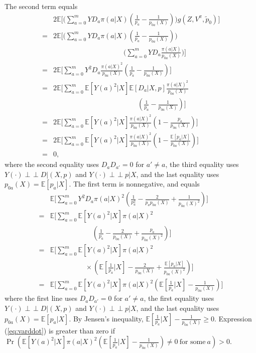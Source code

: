 \documentclass[letterpaper]{article} \usepackage{aaai19}  \usepackage{times}  \usepackage{helvet}  \usepackage{courier}  \usepackage{url}  \usepackage{graphicx}  \frenchspacing  \usepackage{comment}
\newcommand{\indep}{\mathop{\perp\!\!\!\!\perp}}
\begin{document}
The second term equals
\begin{align*}
	&2\mathbb{E}\bigl[\bigl(\sum_{a=0}^mY D_a\pi(a|X)(\frac{1}{p_a}-\frac{1}{p_{0a}(X)})\bigr)g(Z,V^{\pi},\tilde p_0)\bigr]\\
	=&2\mathbb{E}\bigl[\bigl(\sum_{a=0}^mY D_a\pi(a|X)(\frac{1}{p_a}-\frac{1}{p_{0a}(X)})\bigr)\\
	&\hspace{10em}\bigl(\sum_{a=0}^mY D_a\frac{\pi(a|X)}{p_{0a}(X)}\bigr)\bigr]\\
	=&2\mathbb{E}\bigl[\sum_{a=0}^mY^2 D_a\frac{\pi(a|X)^2}{p_{0a}(X)}(\frac{1}{p_a}-\frac{1}{p_{0a}(X)})\bigr]\\
	=&2\mathbb{E}\bigl[\sum_{a=0}^m\mathbb{E}[Y(a)^2|X] \mathbb{E}[D_a|X,p]\frac{\pi(a|X)^2}{p_{0a}(X)}\\
	&\hspace{12em}(\frac{1}{p_a}-\frac{1}{p_{0a}(X)})\bigr]\\
	=&2\mathbb{E}\bigl[\sum_{a=0}^m\mathbb{E}[Y(a)^2|X]\frac{\pi(a|X)^2}{p_{0a}(X)}(1-\frac{p_a}{p_{0a}(X)})\bigr]\\
	=&2\mathbb{E}\bigl[\sum_{a=0}^m\mathbb{E}[Y(a)^2|X]\frac{\pi(a|X)^2}{p_{0a}(X)}(1-\frac{\mathbb{E}[p_a|X]}{p_{0a}(X)})\bigr]\\
	=&0,
\end{align*}
where the second equality uses $D_aD_{a'}=0$ for $a'\neq a$, the third equality uses $Y(\cdot)\indep D|(X,p)$ and $Y(\cdot)\indep p|X$, and the last equality uses $p_{0a}(X)=\mathbb{E}[p_a|X]$.
The first term is nonnegative, and equals
\begin{align}\label{eq:varddot}
	&\mathbb{E}\bigl[\sum_{a=0}^mY^2 D_a\pi(a|X)^2(\frac{1}{p_a^2}-\frac{2}{p_ap_{0a}(X)}+\frac{1}{p_{0a}(X)^2})\bigr]\nonumber\\
	=&\mathbb{E}\bigl[\sum_{a=0}^m\mathbb{E}[Y(a)^2|X] \pi(a|X)^2\nonumber\\
	&\hspace{6em}(\frac{1}{p_a}-\frac{2}{p_{0a}(X)}+\frac{p_a}{p_{0a}(X)^2})\bigr]\nonumber\\
	=&\mathbb{E}\bigl[\sum_{a=0}^m\mathbb{E}[Y(a)^2|X] \pi(a|X)^2\nonumber\\
	&\hspace{5em}\times(\mathbb{E}[\frac{1}{p_a}|X]-\frac{2}{p_{0a}(X)}+\frac{\mathbb{E}[p_a|X]}{p_{0a}(X)^2})\bigr]\nonumber\\
	=&\mathbb{E}\bigl[\sum_{a=0}^m\mathbb{E}[Y(a)^2|X] \pi(a|X)^2(\mathbb{E}[\frac{1}{p_a}|X]-\frac{1}{p_{0a}(X)})\bigr]
\end{align}
where the first line uses $D_aD_{a'}=0$ for $a'\neq a$, the first equality uses $Y(\cdot)\indep D|(X,p)$ and $Y(\cdot)\indep p|X$, and the last equality uses $p_{0a}(X)=\mathbb{E}[p_a|X]$.
By Jensen's inequality, $\mathbb{E}[\frac{1}{p_a}|X]-\frac{1}{p_{0a}(X)}\ge 0$.
Expression (\ref{eq:varddot}) is greater than zero if $\Pr(\mathbb{E}[Y(a)^2|X]\pi(a|X)^2(\mathbb{E}[\frac{1}{p_a}|X]-\frac{1}{p_{0a}(X)})\neq 0~\text{for some}~ a)>0$.
\end{document}
